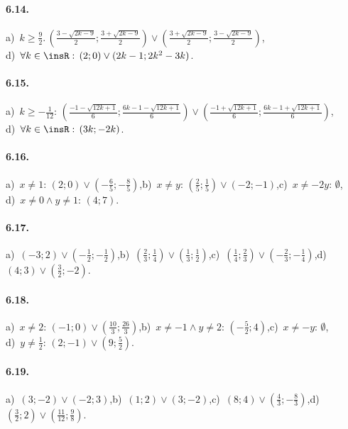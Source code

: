 \paragraph{6.14.} a)~$k\ge \frac 9 2.\, \left(\frac{3-\sqrt{2k-9}} 2; \frac{3+\sqrt{2k-9}} 2\right)\vee \left(\frac{3+\sqrt{2k-9}} 2; \frac{3-\sqrt{2k-9}} 2\right)$,\protect\\
\quad d)~$\forall k\in \insR:\, (2; 0)\vee (2k-1; 2k^2-3k)$.

\paragraph{6.15.} a)~$k\ge -\frac 1{12}:\, \left(\frac{-1-\sqrt{12k+1}} 6; \frac{6k-1-\sqrt{12k+1}} 6\right) \vee \left(\frac{-1+\sqrt{12k+1}} 6; \frac{6k-1+\sqrt{12k+1}} 6\right)$,\protect\\
\quad d)~$\forall k\in \insR:\, (3k; -2k)$.

\paragraph{6.16.} a)~$x\neq 1:\, \left(2;0\right)\vee \left(-\frac 6 5;-\frac 8 5\right)$,\quad b)~$x\neq y:\, \left(\frac 2 5;\frac 1 5\right)\vee \left(-2;-1\right)$,\quad c)~$x\neq -2y:\, \emptyset $,\protect\\
\quad d)~$x\neq 0\wedge y\neq 1:\, (4;7)$.

\paragraph{6.17.} a)~$\left(-3;2\right)\vee \left(-\frac 1 2;-\frac 1 2\right)$,\quad b)~$\left(\frac 2 3;\frac 1 4\right)\vee \left(\frac{1}{3};\frac{1}{2}\right)$,\quad c)~$\left(\frac{1}{4};\frac{2}{3}\right)\vee \left(-\frac{2}{3}; -\frac{1}{4}\right)$,\quad d)~$(4;3)\vee \left(\frac{3}{2};-2\right)$.

\paragraph{6.18.} a)~$x\neq 2:\, \left(-1;0\right)\vee \left(\frac{10} 3;\frac{26} 3\right)$,\quad b)~$x\neq -1\wedge y\neq 2:\, \left(-\frac 5 2;4\right)$,\quad c)~$x\neq -y:\, \emptyset $,\protect\\
\quad d)~$y\neq \frac 1 2:\, \left(2;-1\right)\vee \left(9;\frac 5 2\right)$.

\paragraph{6.19.} a)~$\left(3;-2\right)\vee (-2;3)$,\quad b)~$(1;2)\vee (3;-2)$,\quad c)~$(8;4)\vee \left(\frac{4}{3};-\frac{8}{3}\right)$,\quad d)~$\left(\frac{3} 2;2\right)\vee\left(\frac{11}{12};\frac{9}{8}\right)$.

